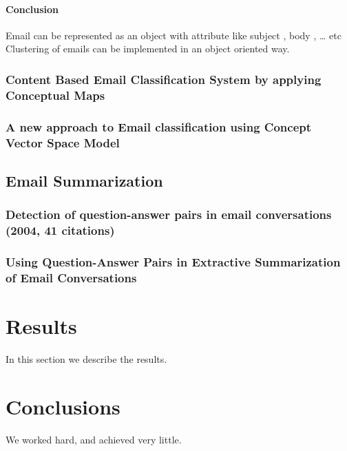 \documentclass[12pt]{article}
\begin{document}
\paragraph{Conclusion}
Email can be represented as an object with attribute like subject , body , … etc
Clustering of emails can be implemented in an object oriented way.




\subsubsection{Content Based Email Classification System by applying Conceptual Maps}
\subsubsection{A new approach to Email classification using Concept Vector Space Model}

\subsection{Email Summarization}
\subsubsection{Detection of question-answer pairs in email conversations (2004, 41 citations)}
\subsubsection{Using Question-Answer Pairs in Extractive Summarization of Email Conversations}

\section{Results}\label{results}
In this section we describe the results.

\section{Conclusions}\label{conclusions}
We worked hard, and achieved very little.



\end{document}
